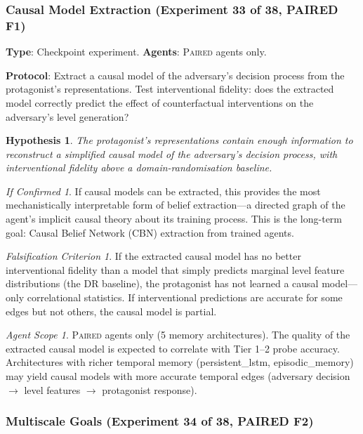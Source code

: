 \documentclass[11pt,a4paper]{article}
\newtheorem{hypothesis}{Hypothesis}[subsection]
\theoremstyle{remark}
\newtheorem*{falsification}{Falsification Criterion}
\newtheorem*{implication}{If Confirmed}
\newtheorem*{agentscope}{Agent Scope}
\newcommand{\paired}{\textsc{Paired}}
\newcommand{\dr}{\textsc{DR}}
\begin{document}
\subsubsection{Causal Model Extraction (Experiment 33 of 38, PAIRED F1)}
\label{exp:causal_model_extraction}

\textbf{Type}: Checkpoint experiment. \textbf{Agents}: \paired{} agents only.

\textbf{Protocol}: Extract a causal model of the adversary's decision process from the protagonist's representations. Test interventional fidelity: does the extracted model correctly predict the effect of counterfactual interventions on the adversary's level generation?

\begin{hypothesis}
The protagonist's representations contain enough information to reconstruct a simplified causal model of the adversary's decision process, with interventional fidelity above a domain-randomisation baseline.
\end{hypothesis}

\begin{implication}
If causal models can be extracted, this provides the most mechanistically interpretable form of belief extraction---a directed graph of the agent's implicit causal theory about its training process. This is the long-term goal: Causal Belief Network (CBN) extraction from trained agents.
\end{implication}

\begin{falsification}
If the extracted causal model has no better interventional fidelity than a model that simply predicts marginal level feature distributions (the \dr{} baseline), the protagonist has not learned a causal model---only correlational statistics. If interventional predictions are accurate for some edges but not others, the causal model is partial.
\end{falsification}

\begin{agentscope}
\paired{} agents only (5 memory architectures). The quality of the extracted causal model is expected to correlate with Tier 1--2 probe accuracy. Architectures with richer temporal memory (persistent\_lstm, episodic\_memory) may yield causal models with more accurate temporal edges (adversary decision $\to$ level features $\to$ protagonist response).
\end{agentscope}

\subsubsection{Multiscale Goals (Experiment 34 of 38, PAIRED F2)}
\label{exp:multiscale_goals}
\end{document}

